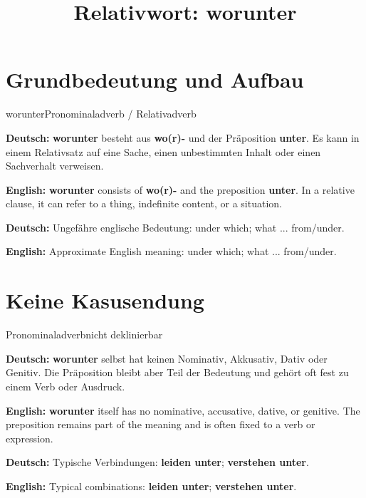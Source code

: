 \documentclass[a4paper,11pt]{article}
\title{Relativwort: \glqq worunter\grqq{}}
\date{}
\newcommand{\GermanText}[1]{\textbf{Deutsch: }#1\par}
\newcommand{\EnglishText}[1]{{\small\color{SoftGray}\textbf{English: }#1\par}}
\begin{document}
\maketitle

\tableofcontents

\newpage

\section{Grundbedeutung und Aufbau}

\begin{grammarentry}{worunter}{Pronominaladverb / Relativadverb}

\GermanText{\textbf{worunter} besteht aus \textbf{wo(r)-} und der Präposition \textbf{unter}. Es kann in einem Relativsatz auf eine Sache, einen unbestimmten Inhalt oder einen Sachverhalt verweisen.}

\EnglishText{\textbf{worunter} consists of \textbf{wo(r)-} and the preposition \textbf{unter}. In a relative clause, it can refer to a thing, indefinite content, or a situation.}

\GermanText{Ungefähre englische Bedeutung: \glqq under which; what ... from/under\grqq{}.}

\EnglishText{Approximate English meaning: \glqq under which; what ... from/under\grqq{}.}

\end{grammarentry}

\section{Keine Kasusendung}

\begin{grammarentry}{Pronominaladverb}{nicht deklinierbar}

\GermanText{\textbf{worunter} selbst hat keinen Nominativ, Akkusativ, Dativ oder Genitiv. Die Präposition bleibt aber Teil der Bedeutung und gehört oft fest zu einem Verb oder Ausdruck.}

\EnglishText{\textbf{worunter} itself has no nominative, accusative, dative, or genitive. The preposition remains part of the meaning and is often fixed to a verb or expression.}

\GermanText{Typische Verbindungen: \textbf{leiden unter}; \textbf{verstehen unter}.}

\EnglishText{Typical combinations: \textbf{leiden unter}; \textbf{verstehen unter}.}

\end{grammarentry}
\end{document}
